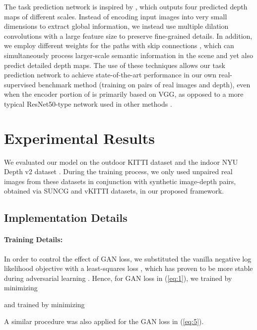 \documentclass[runningheads]{llncs}
\begin{document}
The task prediction network is inspired by \cite{godard2017unsupervised}, which outputs four predicted depth maps of different scales. Instead of encoding input images into very small dimensions to extract global information, we instead use multiple dilation convolutions \cite{YuKoltun2016} with a large feature size to preserve fine-grained details. In addition, we employ different weights for the paths with skip connections \cite{ronneberger2015u}, which can simultaneously process larger-scale semantic information in the scene and yet also predict detailed depth maps. The use of these techniques allows our task prediction network  to achieve state-of-the-art performance in our own real-supervised benchmark method (training  on pairs of real images and depth), even when the encoder portion of  is primarily based on VGG, as opposed to a more typical ResNet50-type network used in other methods \cite{godard2017unsupervised,kuznietsov2017semi}. 

\section{Experimental Results}

We evaluated our model on the outdoor KITTI dataset\cite{Geiger2012CVPR} and the indoor NYU Depth v2 dataset \cite{silberman2012indoor}. During the training process, we only used unpaired real images from these datasets in conjunction with synthetic image-depth pairs, obtained via SUNCG \cite{song2017semantic} and vKITTI \cite{gaidon2016virtualworlds} datasets, in our proposed framework.

\subsection{Implementation Details}
\label{sec:implementation}

\paragraph{\bf Training Details:} In order to control the effect of GAN loss, we substituted the vanilla negative log likelihood objective with a least-squares loss \cite{mao2016multi}, which has proven to be more stable during adversarial learning \cite{zhu2017unpaired}. Hence, for GAN loss  in (\ref{eq:1}), we trained  by minimizing

and trained  by minimizing

A similar procedure was also applied for the GAN loss in (\ref{eq:5}).
\end{document}

